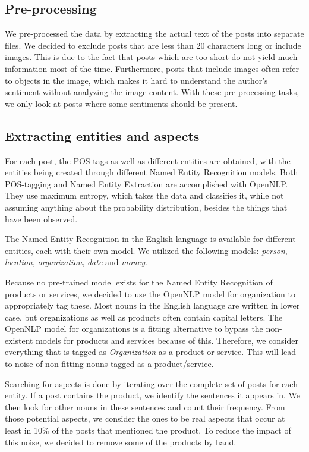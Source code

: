 \documentclass[10pt,a4paper]{article}
\begin{document}
		\subsection{Pre-processing}
		We pre-processed the data by extracting the actual text of the posts into separate files. We decided to exclude posts that are less than 20 characters long or include images. This is due to the fact that posts which are too short do not yield much information most of the time. Furthermore, posts that include images often refer to objects in the image, which makes it hard to understand the author's sentiment without analyzing the image content. With these pre-processing tasks, we only look at posts where some sentiments should be present.
			
		\subsection{Extracting entities and aspects}
		\label{sec:entityextraction}
		For each post, the POS tags as well as different entities are obtained, with the entities being created through different Named Entity Recognition models. Both POS-tagging and Named Entity Extraction are accomplished with OpenNLP.
		They use maximum entropy, which takes the data and classifies it, while not assuming anything about the probability distribution, besides the things that have been observed. 
		
		The Named Entity Recognition in the English language is available for different entities, each with their own model. We utilized the following models: \textit{person}, \textit{location}, \textit{organization}, \textit{date} and \textit{money}.
		
		
		Because no pre-trained model exists for the Named Entity Recognition of products or services, we decided to use the OpenNLP model for organization to appropriately tag these. Most nouns in the English language are written in lower case, but organizations as well as products often contain capital letters. The OpenNLP model for organizations is a fitting alternative to bypass the non-existent models for products and services because of this. Therefore, we consider everything that is tagged as \textit{Organization} as a product or service. This will lead to noise of non-fitting nouns tagged as a product/service. 
		
		
		Searching for aspects is done by iterating over the complete set of posts for each entity. If a post contains the product, we identify the sentences it appears in. We then look for other nouns in these sentences and count their frequency. From those potential aspects, we consider the ones to be real aspects that occur at least in 10\% of the posts that mentioned the product. To reduce the impact of this noise, we decided to remove some of the products by hand.
\end{document}
